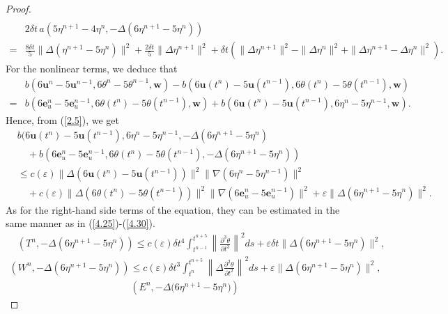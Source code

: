 \documentclass[10pt]{article}
\begin{document}
\begin{proof}
\begin{align}
			\nonumber
		\end{align}
		\begin{align}
			&2\delta t \,a\left(5\eta^{n+1}-4\eta^n,-\Delta( 6\eta^{n+1} - 5\eta^n)\right)\\
			= &\frac{8\delta t}{5}\|\Delta( \eta^{n+1} - 5\eta^n)\|^2+\frac{2\delta t}{5}\|\Delta\eta^{n+1}\|^2+\delta t(\|\Delta\eta^{n+1}\|^2-\|\Delta\eta^{n}\|^2+\|\Delta\eta^{n+1}-\Delta\eta^{n}\|^2).\nonumber
		\end{align}
		For the nonlinear terms, we deduce that
		{ 
		\begin{align}
			&b(6\bm{u}^n-5\bm{u}^{n-1},6\theta^{n}-5\theta^{n-1},\bm{w})-b(6\bm{u}(t^n)-5\bm{u}(t^{n-1}),6\theta(t^{n})-5\theta(t^{n-1}),\bm{w})\nonumber\\
			= &b(6\bm{e}^n_u-5\bm{e}^{n-1}_u,6\theta(t^{n})-5\theta(t^{n-1}),\bm{w})+b(6\bm{u}(t^n)-5\bm{u}(t^{n-1}),6\eta^{n}-5\eta^{n-1},\bm{w}).
		\end{align}}
		Hence, from (\ref{2.5}), we get
		{ 
		\begin{align}
			&b(6\bm{u}(t^n)-5\bm{u}(t^{n-1}),6\eta^{n}-5\eta^{n-1},-\Delta(6 \eta^{n+1} - 5\eta^n)\nonumber\\
			&\quad+b(6\bm{e}^n_u-5\bm{e}^{n-1}_u,6\theta(t^{n})-5\theta(t^{n-1}),-\Delta(6 \eta^{n+1} - 5\eta^n))\nonumber\\
			&\leq c(\varepsilon) \|\Delta(6\bm{u}(t^n)-5\bm{u}(t^{n-1}))\|^2\|\nabla(6\eta^{n}-5\eta^{n-1})\|^2\nonumber\\
			& \quad+c(\varepsilon) \|\Delta(6\theta(t^{n})-5\theta(t^{n-1}))\|^2\|\nabla(6\bm{e}_u^{n}-5\bm{e}_u^{n-1})\|^2+\varepsilon\|\Delta(6 \eta^{n+1} - 5\eta^n)\|^2.
		\end{align}}
		As for the right-hand side terms of the equation, they can be estimated in the same manner as in (\ref{4.25})-(\ref{4.30}).  
		\begin{align}
			&(T^n,-\Delta(6 \eta^{n+1} - 5\eta^n))\leq c(\varepsilon)\delta t^4\int_{t^{n-1}}^{t^{n+5}}\left\|\frac{\partial^3\theta}{\partial t^3}\right\|^2ds+\varepsilon \delta t\|\Delta(6 \eta^{n+1} - 5\eta^n)\|^2,
		\end{align}
		\begin{align}
			(W^n,-\Delta(6 \eta^{n+1} - 5\eta^n))\leq c(\varepsilon)\delta t^3\int_{t^{n}}^{t^{n+5}}\left\|\Delta\frac{\partial^2\theta}{\partial t^2}\right\|^2ds+\varepsilon \|\Delta(6 \eta^{n+1} - 5\eta^n)\|^2,
		\end{align}
		\begin{align}\label{4.39}
			&( E^n, -\Delta\bigl(6\eta^{n+1} - 5\eta^n\bigr) )

\end{align}
\end{proof}
\end{document}
